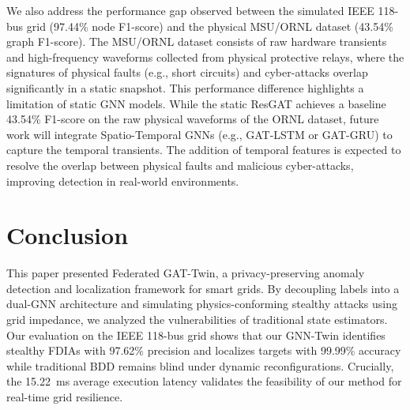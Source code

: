 \documentclass[conference]{IEEEtran}
\begin{document}
We also address the performance gap observed between the simulated IEEE 118-bus grid (97.44\% node F1-score) and the physical MSU/ORNL dataset (43.54\% graph F1-score). The MSU/ORNL dataset consists of raw hardware transients and high-frequency waveforms collected from physical protective relays, where the signatures of physical faults (e.g., short circuits) and cyber-attacks overlap significantly in a static snapshot. This performance difference highlights a limitation of static GNN models. While the static ResGAT achieves a baseline 43.54\% F1-score on the raw physical waveforms of the ORNL dataset, future work will integrate Spatio-Temporal GNNs (e.g., GAT-LSTM or GAT-GRU) to capture the temporal transients. The addition of temporal features is expected to resolve the overlap between physical faults and malicious cyber-attacks, improving detection in real-world environments.

\section{Conclusion}\label{sec:conclusion}
This paper presented Federated GAT-Twin, a privacy-preserving anomaly detection and localization framework for smart grids. By decoupling labels into a dual-GNN architecture and simulating physics-conforming stealthy attacks using grid impedance, we analyzed the vulnerabilities of traditional state estimators. Our evaluation on the IEEE 118-bus grid shows that our GNN-Twin identifies stealthy FDIAs with 97.62\% precision and localizes targets with 99.99\% accuracy while traditional BDD remains blind under dynamic reconfigurations. Crucially, the 15.22~ms average execution latency validates the feasibility of our method for real-time grid resilience.
\end{document}
